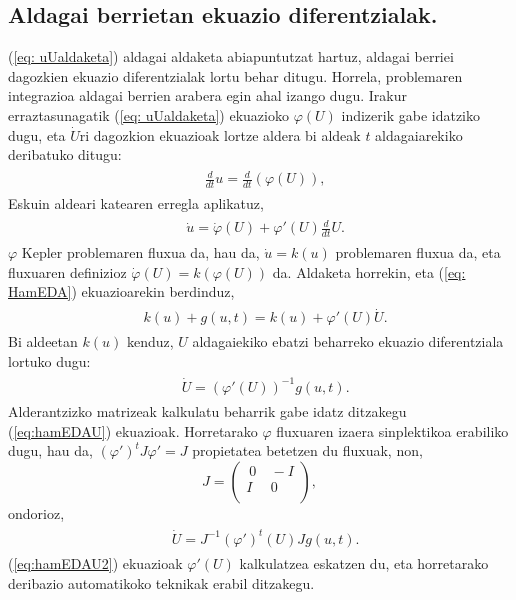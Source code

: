 \subsection*{Aldagai berrietan ekuazio diferentzialak.}

(\ref{eq: uUaldaketa}) aldagai aldaketa abiapuntutzat hartuz, aldagai berriei dagozkien ekuazio diferentzialak lortu behar ditugu. Horrela, problemaren integrazioa aldagai berrien arabera egin ahal izango dugu. Irakur erraztasunagatik (\ref{eq: uUaldaketa}) ekuazioko $\varphi(U)$ indizerik gabe idatziko dugu, eta $\dot{U}$ri dagozkion ekuazioak lortze aldera bi aldeak $t$ aldagaiarekiko deribatuko ditugu:  
\begin{align}
\begin{split}
&\frac{d}{dt}u = \frac{d}{dt}\left(\varphi(U)\right),
\end{split}
\end{align}
Eskuin aldeari katearen erregla aplikatuz, 
\begin{align}
\begin{split}
&\dot{u} = \dot{\varphi}(U) + \varphi'(U) \frac{d}{dt}U.
\end{split}
\end{align}
$\varphi$ Kepler problemaren fluxua da, hau da, $\dot{u} = k(u)$ problemaren fluxua da, eta fluxuaren definizioz $\dot{\varphi}(U) = k(\varphi(U))$ da. Aldaketa horrekin,  eta (\ref{eq: HamEDA}) ekuazioarekin berdinduz,
\begin{align}
\begin{split}
&k(u) + g(u,t) = k(u) + \varphi'(U) \dot{U}.
\end{split}
\end{align}
Bi aldeetan $k(u)$  kenduz, $U$ aldagaiekiko ebatzi beharreko ekuazio diferentziala lortuko dugu:
\begin{align}
\begin{split}
\label{eq:hamEDAU}
&\dot{U} = \left(\varphi'(U)\right)^{-1} g(u,t).
\end{split}
\end{align}
Alderantzizko matrizeak kalkulatu beharrik gabe idatz ditzakegu (\ref{eq:hamEDAU}) ekuazioak. Horretarako $\varphi$ fluxuaren izaera sinplektikoa erabiliko dugu, hau da, $(\varphi')^tJ\varphi'= J$ propietatea betetzen du fluxuak,
non, 
\begin{equation*}
 J=\left(\begin{array}{cc}
   \ 0 & \ -I \\
     I & \ 0  \\
\end{array}\right),
\end{equation*}
ondorioz,
%
\begin{align}
\begin{split}
\label{eq:hamEDAU2}
&\dot{U} = J^{-1}(\varphi')^{t}(U)J g(u,t).
\end{split}
\end{align}
(\ref{eq:hamEDAU2}) ekuazioak $\varphi'(U)$ kalkulatzea eskatzen du, eta horretarako deribazio automatikoko teknikak erabil ditzakegu.


